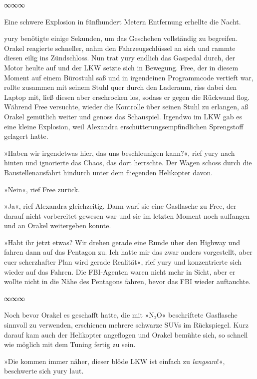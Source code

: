 \begin{center}
	∞∞∞
\end{center}

Eine schwere Explosion in fünfhundert Metern Entfernung erhellte die Nacht.

yury benötigte einige Sekunden, um das Geschehen vollständig zu begreifen. Orakel reagierte schneller, nahm den Fahrzeugschlüssel an sich und rammte diesen eilig ins Zündschloss. Nun trat yury endlich das Gaspedal durch, der Motor heulte auf und der LKW setzte sich in Bewegung. Free, der in diesem Moment auf einem Bürostuhl saß und in irgendeinen Programmcode vertieft war, rollte zusammen mit seinem Stuhl quer durch den Laderaum, riss dabei den Laptop mit, ließ diesen aber erschrocken los, sodass er gegen die Rückwand flog. Während Free versuchte, wieder die Kontrolle über seinen Stuhl zu erlangen, aß Orakel gemütlich weiter und genoss das Schauspiel. Irgendwo im LKW gab es eine kleine Explosion, weil Alexandra erschütterungsempfindlichen Sprengstoff gelagert hatte.

»Haben wir irgendetwas hier, das uns beschleunigen kann?«, rief yury nach hinten und ignorierte das Chaos, das dort herrschte. Der Wagen schoss durch die Baustellenausfahrt hindurch unter dem fliegenden Helikopter davon.

»Nein«, rief Free zurück.

»Ja«, rief Alexandra gleichzeitig. Dann warf sie eine Gasflasche zu Free, der darauf nicht vorbereitet gewesen war und sie im letzten Moment noch auffangen und an Orakel weitergeben konnte.

»Habt ihr jetzt etwas? Wir drehen gerade eine Runde über den Highway und fahren dann auf das Pentagon zu. Ich hatte mir das zwar anders vorgestellt, aber euer scherzhafter Plan wird gerade Realität«, rief yury und konzentrierte sich wieder auf das Fahren. Die FBI-Agenten waren nicht mehr in Sicht, aber er wollte nicht in die Nähe des Pentagons fahren, bevor das FBI wieder auftauchte.

\begin{center}
	∞∞∞
\end{center}

Noch bevor Orakel es geschafft hatte, die mit »N₂O« beschriftete Gasflasche sinnvoll zu verwenden, erschienen mehrere schwarze SUVs im Rückspiegel. Kurz darauf kam auch der Helikopter angeflogen und Orakel bemühte sich, so schnell wie möglich mit dem Tuning fertig zu sein.

»Die kommen immer näher, dieser blöde LKW ist einfach zu \emph{langsam}!«, beschwerte sich yury laut.


